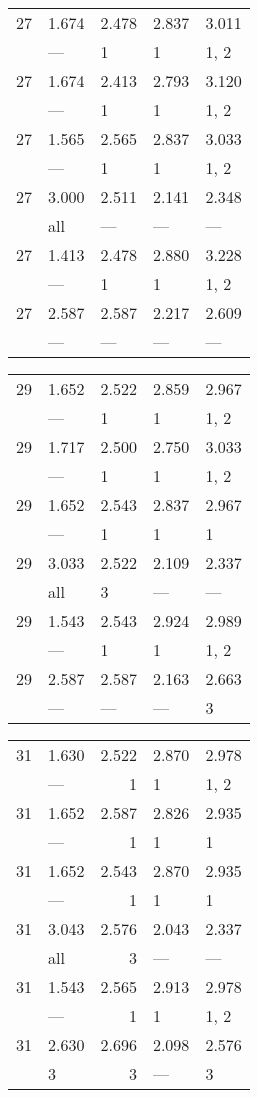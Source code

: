 \begin{tabular}{lllll}
\toprule
 27 & 1.674 & 2.478 & 2.837 & 3.011 \\
    & ---   & 1     & 1     & 1, 2  \\
 27 & 1.674 & 2.413 & 2.793 & 3.120 \\
    & ---   & 1     & 1     & 1, 2  \\
 27 & 1.565 & 2.565 & 2.837 & 3.033 \\
    & ---   & 1     & 1     & 1, 2  \\
 27 & 3.000 & 2.511 & 2.141 & 2.348 \\
    & all   & ---   & ---   & ---   \\
 27 & 1.413 & 2.478 & 2.880 & 3.228 \\
    & ---   & 1     & 1     & 1, 2  \\
 27 & 2.587 & 2.587 & 2.217 & 2.609 \\
    & ---   & ---   & ---   & ---   \\
\bottomrule
\end{tabular}
\begin{tabular}{lllll}
\toprule
 29 & 1.652 & 2.522 & 2.859 & 2.967 \\
    & ---   & 1     & 1     & 1, 2  \\
 29 & 1.717 & 2.500 & 2.750 & 3.033 \\
    & ---   & 1     & 1     & 1, 2  \\
 29 & 1.652 & 2.543 & 2.837 & 2.967 \\
    & ---   & 1     & 1     & 1     \\
 29 & 3.033 & 2.522 & 2.109 & 2.337 \\
    & all   & 3     & ---   & ---   \\
 29 & 1.543 & 2.543 & 2.924 & 2.989 \\
    & ---   & 1     & 1     & 1, 2  \\
 29 & 2.587 & 2.587 & 2.163 & 2.663 \\
    & ---   & ---   & ---   & 3     \\
\bottomrule
\end{tabular}
\begin{tabular}{llrll}
\toprule
 31 & 1.630 & 2.522 & 2.870 & 2.978 \\
    & ---   & 1     & 1     & 1, 2  \\
 31 & 1.652 & 2.587 & 2.826 & 2.935 \\
    & ---   & 1     & 1     & 1     \\
 31 & 1.652 & 2.543 & 2.870 & 2.935 \\
    & ---   & 1     & 1     & 1     \\
 31 & 3.043 & 2.576 & 2.043 & 2.337 \\
    & all   & 3     & ---   & ---   \\
 31 & 1.543 & 2.565 & 2.913 & 2.978 \\
    & ---   & 1     & 1     & 1, 2  \\
 31 & 2.630 & 2.696 & 2.098 & 2.576 \\
    & 3     & 3     & ---   & 3     \\
\bottomrule
\end{tabular}
